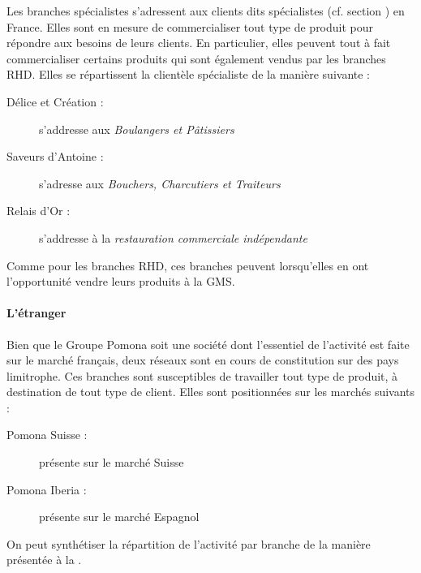                 Les branches spécialistes s'adressent aux clients dits spécialistes (cf. section ) en France.
                Elles sont en mesure de commercialiser tout type de produit pour répondre aux besoins de leurs clients.
                En particulier, elles peuvent tout à fait commercialiser certains produits qui sont également vendus par les branches RHD.
                Elles se répartissent la clientèle spécialiste de la manière suivante :
                \begin{description}
                    \item[Délice et Création :] s'addresse aux \emph{Boulangers et Pâtissiers}
                    \item[Saveurs d'Antoine :] s'adresse aux \emph{Bouchers, Charcutiers et Traiteurs}
                    \item[Relais d'Or :] s'addresse à la \emph{restauration commerciale indépendante}
                \end{description}
                Comme pour les branches RHD, ces branches peuvent lorsqu'elles en ont l'opportunité vendre leurs produits à la GMS.

                \paragraph{L'étranger}

                Bien que le Groupe Pomona soit une société dont l'essentiel de l'activité est faite sur le marché français, deux réseaux sont en cours de constitution sur des pays limitrophe.
                Ces branches sont susceptibles de travailler tout type de produit, à destination de tout type de client.
                Elles sont positionnées sur les marchés suivants : 
                \begin{description}
                    \item[Pomona Suisse :] présente sur le marché Suisse
                    \item[Pomona Iberia :] présente sur le marché Espagnol 
                \end{description}

                On peut synthétiser la répartition de l'activité par branche de la manière présentée à la .

